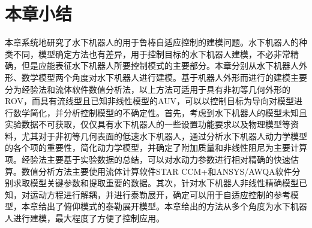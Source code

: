 \section{本章小结 }

本章系统地研究了水下机器人的用于鲁棒自适应控制的建模问题。水下机器人的种类不同，模型确定方法也有差异，用于控制目标的水下机器人建模，不必非常精确，但是应能表征水下机器人所要控制模式的主要部分。本章分别从水下机器人外形、数学模型两个角度对水下机器人进行建模。基于机器人外形而进行的建模主要分为经验法和流体软件数值分析法，以上方法可适用于具有非初等几何外形的ROV，而具有流线型且已知非线性模型的AUV，可以以控制目标为导向对模型进行数学简化，并分析控制模型的不确定性。首先，考虑到水下机器人的模型未知且实验数据不可获取，仅仅具有水下机器人的一些设置功能要求以及物理模型等资料，尤其对于非初等几何表面的低速水下机器人，通过分析水下机器人动力学模型的各个项的重要性，简化动力学模型，并确定了附加质量和非线性阻尼为主要计算项。经验法主要基于实验数据的总结，可以对水动力参数进行相对精确的快速估算。数值分析方法主要使用流体计算软件STAR CCM+和ANSYS/AWQA软件分别求取模型关键参数和提取重要的数据。其次，针对水下机器人非线性精确模型已知，对运动方程进行解耦，并进行泰勒展开，确定可以用于自适应控制的参考模型，本章给出了俯仰模式的泰勒展开模型。本章给出的方法从多个角度为水下机器人进行建模，最大程度了方便了控制应用。
